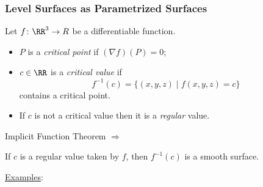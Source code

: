 \begin{frame}
  \frametitle{Level Surfaces as Parametrized Surfaces}

Let $f \colon \RR^3 \to R$ be a differentiable function.
\begin{itemize}
  \item $P$ is a \emph{critical point} if $(\nabla f)(P) = 0$;
  \item $c \in \RR$ is a \emph{critical value} if
%
$$f^{-1}(c) = \{ (x,y,z) \; | \; f(x,y,z) = c\}$$
%
contains a critical point.
\item If $c$ is not a critical value then it is a \emph{regular} value.
\end{itemize}

Implicit Function Theorem $\Longrightarrow$

If $c$ is a regular value taken by $f$, then $f^{-1}(c)$ is a smooth surface.

\underline{Examples}:
 \begin{overlayarea}{\textheight}{5cm}

 \end{overlayarea}
\end{frame}

